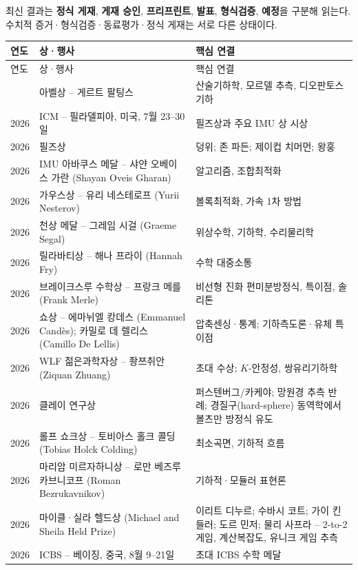 

\noindent 최신 결과는 \textbf{정식 게재}, \textbf{게재 승인}, \textbf{프리프린트}, \textbf{발표}, \textbf{형식검증}, \textbf{예정}을 구분해 읽는다. 수치적 증거·형식검증·동료평가·정식 게재는 서로 다른 상태이다.

\begin{center}
\small
\renewcommand{\arraystretch}{1.03}
\begin{longtable}{@{}L{0.09\textwidth}L{0.28\textwidth}L{0.55\textwidth}@{}}
\toprule
연도 & 상·행사 & 핵심 연결\\
\midrule
\endfirsthead
\toprule 연도 & 상·행사 & 핵심 연결\\ \midrule \endhead
\bottomrule{} & 아벨상 -- 게르트 팔팅스 & 산술기하학, 모르델 추측, 디오판토스 기하\\
2026 & ICM -- 필라델피아, 미국, 7월 23--30일 & 필즈상과 주요 IMU 상 시상\\
2026 & 필즈상 & 덩위; 존 파든; 제이컵 치머먼; 왕훙\\
2026 & IMU 아바쿠스 메달 -- 샤얀 오베이스 가란 (Shayan Oveis Gharan) & 알고리즘, 조합최적화\\
2026 & 가우스상 -- 유리 네스테로프 (Yurii Nesterov) & 볼록최적화, 가속 1차 방법\\
2026 & 천상 메달 -- 그레임 시걸 (Graeme Segal) & 위상수학, 기하학, 수리물리학\\
2026 & 릴라바티상 -- 해나 프라이 (Hannah Fry) & 수학 대중소통\\
2026 & 브레이크스루 수학상 -- 프랑크 메를 (Frank Merle) & 비선형 진화 편미분방정식, 특이점, 솔리톤\\
2026 & 쇼상 -- 에마뉘엘 캉데스 (Emmanuel Candès); 카밀로 데 렐리스 (Camillo De Lellis) & 압축센싱·통계; 기하측도론·유체 특이점\\
2026 & WLF 젊은과학자상 -- 좡쯔취안 (Ziquan Zhuang) & 초대 수상; $K$-안정성, 쌍유리기하학\\
2026 & 클레이 연구상 & 퍼스텐버그/카케야; 망원경 추측 반례; 경질구(hard-sphere) 동역학에서 볼츠만 방정식 유도\\
2026 & 롤프 쇼크상 -- 토비아스 홀크 콜딩 (Tobias Holck Colding) & 최소곡면, 기하적 흐름\\
2026 & 마리암 미르자하니상 -- 로만 베즈루카브니코프 (Roman Bezrukavnikov) & 기하적·모듈러 표현론\\
2026 & 마이클·실라 헬드상 (Michael and Sheila Held Prize) & 이리트 디누르; 수바시 코트; 가이 킨들러; 도르 민저; 물리 사프라 -- 2-to-2 게임, 계산복잡도, 유니크 게임 추측\\
2026 & ICBS -- 베이징, 중국, 8월 9--21일 & 초대 ICBS 수학 메달\\
\end{longtable}
\end{center}

